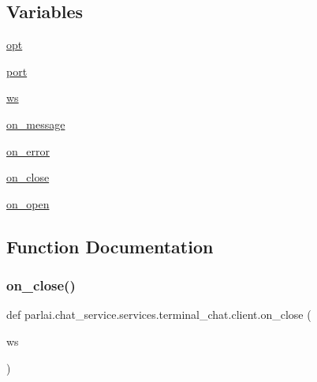 \subsection*{Variables}
\begin{DoxyCompactItemize}
\item 
\hyperlink{namespaceparlai_1_1chat__service_1_1services_1_1terminal__chat_1_1client_a16dfd59983c5d7950c625f7875dd548f}{opt}
\item 
\hyperlink{namespaceparlai_1_1chat__service_1_1services_1_1terminal__chat_1_1client_a0194aca169d8123629fe13a25fa24421}{port}
\item 
\hyperlink{namespaceparlai_1_1chat__service_1_1services_1_1terminal__chat_1_1client_a8cf84390ff82d21619917c2366685540}{ws}
\item 
\hyperlink{namespaceparlai_1_1chat__service_1_1services_1_1terminal__chat_1_1client_adf489f8bb6e50fb81cb11026a6c8a6e2}{on\+\_\+message}
\item 
\hyperlink{namespaceparlai_1_1chat__service_1_1services_1_1terminal__chat_1_1client_ad56fc75b2133d8955e995295f957ae9f}{on\+\_\+error}
\item 
\hyperlink{namespaceparlai_1_1chat__service_1_1services_1_1terminal__chat_1_1client_a1e649790b7894d7f11baa94ab44dfc6c}{on\+\_\+close}
\item 
\hyperlink{namespaceparlai_1_1chat__service_1_1services_1_1terminal__chat_1_1client_a16b659ee0f9fa10a5392cf5a61a424be}{on\+\_\+open}
\end{DoxyCompactItemize}


\subsection{Function Documentation}
\mbox{\label{namespaceparlai_1_1chat__service_1_1services_1_1terminal__chat_1_1client_a02c04f40cfa11defbf5c83bbe46aba00}} 
\subsubsection{\texorpdfstring{on\+\_\+close()}{on\_close()}}
{\footnotesize\ttfamily def parlai.\+chat\+\_\+service.\+services.\+terminal\+\_\+chat.\+client.\+on\+\_\+close (\begin{DoxyParamCaption}\item[{}]{ws }\end{DoxyParamCaption})}

